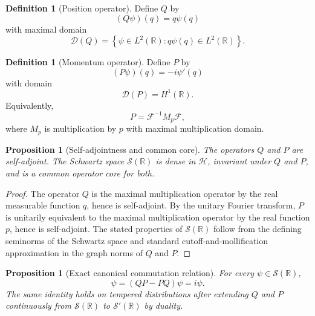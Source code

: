 \documentclass[11pt]{amsart}
\numberwithin{equation}{section}
\theoremstyle{plain}
\newtheorem{proposition}[theorem]{Proposition}
\theoremstyle{definition}
\newtheorem{definition}[theorem]{Definition}
\theoremstyle{remark}
\newcommand{\R}{\mathbb{R}}
\newcommand{\Hil}{\mathcal{H}}
\newcommand{\Sch}{\mathcal{S}}
\newcommand{\Four}{\mathcal{F}}
\newcommand{\Dom}{\mathcal{D}}
\begin{document}
\begin{definition}[Position operator]
\label{def:position_operator_exact}
Define $Q$ by
\begin{equation}
(Q\psi)(q)=q\psi(q)
\label{eq:Q_action}
\end{equation}
with maximal domain
\begin{equation}
\Dom(Q)
=\left\{\psi\in L^2(\R):q\psi(q)\in L^2(\R)\right\}.
\label{eq:Q_domain}
\end{equation}
\end{definition}

\begin{definition}[Momentum operator]
\label{def:momentum_operator_exact}
Define $P$ by
\begin{equation}
(P\psi)(q)=-i\psi'(q)
\label{eq:P_action}
\end{equation}
with domain
\begin{equation}
\Dom(P)=H^1(\R).
\label{eq:P_domain}
\end{equation}
Equivalently,
\begin{equation}
P=\Four^{-1}M_p\Four,
\label{eq:P_fourier_realization}
\end{equation}
where $M_p$ is multiplication by $p$ with maximal multiplication domain.
\end{definition}

\begin{proposition}[Self-adjointness and common core]
\label{prop:selfadjoint_QP}
The operators $Q$ and $P$ are self-adjoint.  The Schwartz space
$\Sch(\R)$ is dense in $\Hil$, invariant under $Q$ and $P$, and is a common
operator core for both.
\end{proposition}

\begin{proof}
The operator $Q$ is the maximal multiplication operator by the real
measurable function $q$, hence is self-adjoint.  By the unitary Fourier
transform, $P$ is unitarily equivalent to the maximal multiplication
operator by the real function $p$, hence is self-adjoint.  The stated
properties of $\Sch(\R)$ follow from the defining seminorms of the Schwartz
space and standard cutoff-and-mollification approximation in the graph
norms of $Q$ and $P$.
\end{proof}

\begin{proposition}[Exact canonical commutation relation]
\label{prop:CCR}
For every $\psi\in\Sch(\R)$,
\begin{equation}
[Q,P]\psi
=(QP-PQ)\psi
=i\psi.
\label{eq:CCR_schwartz}
\end{equation}
The same identity holds on tempered distributions after extending $Q$ and
$P$ continuously from $\Sch(\R)$ to $\Sch'(\R)$ by duality.
\end{proposition}
\end{document}
